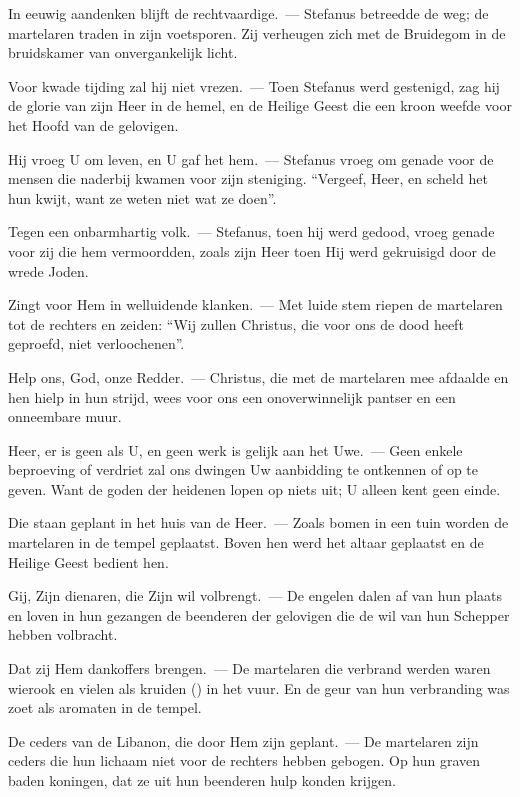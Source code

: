 \documentclass[12pt,twoside,a5paper]{article}
\begin{document}
\begin{halfparskip}
  In eeuwig aandenken blijft de rechtvaardige.~--- Stefanus betreedde de weg; de martelaren traden in zijn voetsporen. Zij verheugen zich met de Bruidegom in de bruidskamer van onvergankelijk licht.

  Voor kwade tijding zal hij niet vrezen.~--- Toen Stefanus werd gestenigd, zag hij de glorie van zijn Heer in de hemel, en de Heilige Geest die een kroon weefde voor het Hoofd van de gelovigen.

  Hij vroeg U om leven, en U gaf het hem.~--- Stefanus vroeg om genade voor de mensen die naderbij kwamen voor zijn steniging. ``Vergeef, Heer, en scheld het hun kwijt, want ze weten niet wat ze doen''.

  Tegen een onbarmhartig volk.~--- Stefanus, toen hij werd gedood, vroeg genade voor zij die hem vermoordden, zoals zijn Heer toen Hij werd gekruisigd door de wrede Joden.

  Zingt voor Hem in welluidende klanken.~--- Met luide stem riepen de martelaren tot de rechters en zeiden: ``Wij zullen Christus, die voor ons de dood heeft geproefd, niet verloochenen''.

  Help ons, God, onze Redder.~--- Christus, die met de martelaren mee afdaalde en hen hielp in hun strijd, wees voor ons een onoverwinnelijk pantser en een onneembare muur.

  Heer, er is geen als U, en geen werk is gelijk aan het Uwe.~--- Geen enkele beproeving of verdriet zal ons dwingen Uw aanbidding te ontkennen of op te geven. Want de goden der heidenen lopen op niets uit; U alleen kent geen einde.

  Die staan geplant in het huis van de Heer.~--- Zoals bomen in een tuin worden de martelaren in de tempel geplaatst. Boven hen werd het altaar geplaatst en de Heilige Geest bedient hen.

  Gij, Zijn dienaren, die Zijn wil volbrengt.~--- De engelen dalen af van hun plaats en loven in hun gezangen de beenderen der gelovigen die de wil van hun Schepper hebben volbracht.

  Dat zij Hem dankoffers brengen.~--- De martelaren die verbrand werden waren wierook en vielen als kruiden () in het vuur. En de geur van hun verbranding was zoet als aromaten in de tempel.

  De ceders van de Libanon, die door Hem zijn geplant.~--- De martelaren zijn ceders die hun lichaam niet voor de rechters hebben gebogen. Op hun graven baden koningen, dat ze uit hun beenderen hulp konden krijgen.


\end{halfparskip}
\end{document}
